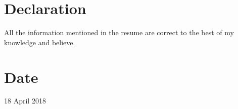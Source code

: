 \documentclass[12pt]{article}
\begin{document}
\section*{\large {Declaration}}
All the information mentioned in the resume are correct to the best of my knowledge and believe.
\section*{\large {Date}}
18 April 2018
 
\end{document}
